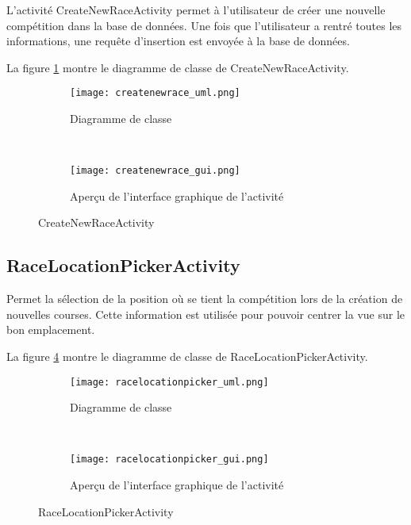L'activité CreateNewRaceActivity permet à l'utilisateur de créer une nouvelle compétition dans la base de données. Une fois que l'utilisateur a rentré toutes les informations, une requête d'insertion est envoyée à la base de données.

La figure \ref{fig:createnewrace_uml} montre le diagramme de classe de CreateNewRaceActivity.

\begin{figure}[htb!]
    \centering
    \begin{subfigure}[htb]{0.49\textwidth}
		\texttt{[image: createnewrace\_uml.png]} 
		\caption{Diagramme de classe}
		\label{fig:createnewrace_uml}
    \end{subfigure}
    ~ %
    \begin{subfigure}[htb]{0.49\textwidth}
		\texttt{[image: createnewrace\_gui.png]} 
		\caption{Aperçu de l'interface graphique de l'activité}
		\label{fig:createnewrace_gui}
    \end{subfigure}
    \caption{CreateNewRaceActivity}\label{fig:createnewrace_fig}
\end{figure}

\subsection{RaceLocationPickerActivity}

Permet la sélection de la position où se tient la compétition lors de la création de nouvelles courses. Cette information est utilisée pour pouvoir centrer la vue sur le bon emplacement.

La figure \ref{fig:racelocationpicker_uml} montre le diagramme de classe de RaceLocationPickerActivity.

\begin{figure}[htb!]
    \centering
    \begin{subfigure}[htb]{0.49\textwidth}
		\texttt{[image: racelocationpicker\_uml.png]} 
		\caption{Diagramme de classe}
		\label{fig:racelocationpicker_uml}
    \end{subfigure}
    ~ %
    \begin{subfigure}[htb]{0.49\textwidth}
		\texttt{[image: racelocationpicker\_gui.png]} 
		\caption{Aperçu de l'interface graphique de l'activité}
		\label{fig:racelocationpicker_gui}
    \end{subfigure}
    \caption{RaceLocationPickerActivity}\label{fig:racelocationpicker_fig}
\end{figure}

